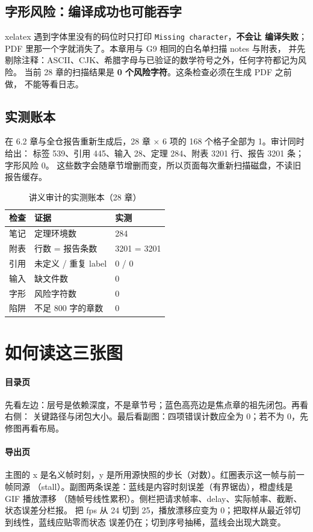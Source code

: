 \subsection{字形风险：编译成功也可能吞字}

xelatex 遇到字体里没有的码位时只打印 \texttt{Missing character}，\textbf{不会让
编译失败}；PDF 里那一个字就消失了。本章用与 G9 相同的白名单扫描 notes 与附表，
并先剔除注释：ASCII、CJK、希腊字母与已验证的数学符号之外，任何字符都记为风险。
当前 28 章的扫描结果是 \textbf{0 个风险字符}。这条检查必须在生成 PDF 之前做，
不能等看日志。

\subsection{实测账本}

在 6.2 章与全仓报告重新生成后，28 章 × 6 项的 168 个格子全部为 1。审计同时给出：
标签 539、引用 445、输入 28、定理 284、附表 3201 行、报告 3201 条；字形风险 0。
这些数字会随章节增删而变，所以页面每次重新扫描磁盘，不读旧报告缓存。

\begin{table}[htbp]
\centering
\caption{讲义审计的实测账本（28 章）}
\begin{tabular}{lll}
\toprule
检查 & 证据 & 实测 \\
\midrule
笔记 & 定理环境数 & 284 \\
附表 & 行数 = 报告条数 & 3201 = 3201 \\
引用 & 未定义 / 重复 label & $0$ / $0$ \\
输入 & 缺文件数 & $0$ \\
字形 & 风险字符数 & $0$ \\
陷阱 & 不足 800 字的章数 & $0$ \\
\bottomrule
\end{tabular}
\end{table}

\section{如何读这三张图}

\paragraph{目录页}
先看左边：层号是依赖深度，不是章节号；蓝色高亮边是焦点章的祖先闭包。再看右侧：
关键路径与闭包大小。最后看副图：四项错误计数应全为 0；若不为 0，先修图再看布局。

\paragraph{导出页}
主图的 x 是名义帧时刻，y 是所用源快照的步长（对数）。红圈表示这一帧与前一帧同源
（stall）。副图两条误差：蓝线是内容时刻误差（有界锯齿），橙虚线是 GIF 播放漂移
（随帧号线性累积）。侧栏把请求帧率、delay、实际帧率、截断、状态误差分栏报。
把 fps 从 24 切到 25，播放漂移应变为 0；把取样从最近邻切到线性，蓝线应贴零而状态
误差仍在；切到序号抽稀，蓝线会出现大跳变。

